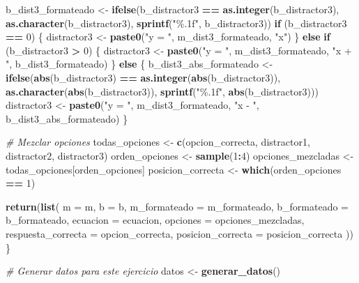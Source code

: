 \documentclass[
]{article}
\newenvironment{Shaded}{\begin{snugshade}}{\end{snugshade}}
\newcommand{\AttributeTok}[1]{\textcolor[rgb]{0.13,0.29,0.53}{#1}}
\newcommand{\CommentTok}[1]{\textcolor[rgb]{0.56,0.35,0.01}{\textit{#1}}}
\newcommand{\ControlFlowTok}[1]{\textcolor[rgb]{0.13,0.29,0.53}{\textbf{#1}}}
\newcommand{\DecValTok}[1]{\textcolor[rgb]{0.00,0.00,0.81}{#1}}
\newcommand{\FunctionTok}[1]{\textcolor[rgb]{0.13,0.29,0.53}{\textbf{#1}}}
\newcommand{\NormalTok}[1]{#1}
\newcommand{\OtherTok}[1]{\textcolor[rgb]{0.56,0.35,0.01}{#1}}
\newcommand{\SpecialCharTok}[1]{\textcolor[rgb]{0.81,0.36,0.00}{\textbf{#1}}}
\newcommand{\StringTok}[1]{\textcolor[rgb]{0.31,0.60,0.02}{#1}}
\begin{document}
\begin{Shaded}
\begin{Highlighting}[]
\NormalTok{  b\_dist3\_formateado }\OtherTok{\textless{}{-}} \FunctionTok{ifelse}\NormalTok{(b\_distractor3 }\SpecialCharTok{==} \FunctionTok{as.integer}\NormalTok{(b\_distractor3), }
                               \FunctionTok{as.character}\NormalTok{(b\_distractor3), }
                               \FunctionTok{sprintf}\NormalTok{(}\StringTok{"\%.1f"}\NormalTok{, b\_distractor3))}
  \ControlFlowTok{if}\NormalTok{ (b\_distractor3 }\SpecialCharTok{==} \DecValTok{0}\NormalTok{) \{}
\NormalTok{    distractor3 }\OtherTok{\textless{}{-}} \FunctionTok{paste0}\NormalTok{(}\StringTok{"y = "}\NormalTok{, m\_dist3\_formateado, }\StringTok{"x"}\NormalTok{)}
\NormalTok{  \} }\ControlFlowTok{else} \ControlFlowTok{if}\NormalTok{ (b\_distractor3 }\SpecialCharTok{\textgreater{}} \DecValTok{0}\NormalTok{) \{}
\NormalTok{    distractor3 }\OtherTok{\textless{}{-}} \FunctionTok{paste0}\NormalTok{(}\StringTok{"y = "}\NormalTok{, m\_dist3\_formateado, }\StringTok{"x + "}\NormalTok{, b\_dist3\_formateado)}
\NormalTok{  \} }\ControlFlowTok{else}\NormalTok{ \{}
\NormalTok{    b\_dist3\_abs\_formateado }\OtherTok{\textless{}{-}} \FunctionTok{ifelse}\NormalTok{(}\FunctionTok{abs}\NormalTok{(b\_distractor3) }\SpecialCharTok{==} \FunctionTok{as.integer}\NormalTok{(}\FunctionTok{abs}\NormalTok{(b\_distractor3)), }
                                     \FunctionTok{as.character}\NormalTok{(}\FunctionTok{abs}\NormalTok{(b\_distractor3)), }
                                     \FunctionTok{sprintf}\NormalTok{(}\StringTok{"\%.1f"}\NormalTok{, }\FunctionTok{abs}\NormalTok{(b\_distractor3)))}
\NormalTok{    distractor3 }\OtherTok{\textless{}{-}} \FunctionTok{paste0}\NormalTok{(}\StringTok{"y = "}\NormalTok{, m\_dist3\_formateado, }\StringTok{"x {-} "}\NormalTok{, b\_dist3\_abs\_formateado)}
\NormalTok{  \}}
  
  \CommentTok{\# Mezclar opciones}
\NormalTok{  todas\_opciones }\OtherTok{\textless{}{-}} \FunctionTok{c}\NormalTok{(opcion\_correcta, distractor1, distractor2, distractor3)}
\NormalTok{  orden\_opciones }\OtherTok{\textless{}{-}} \FunctionTok{sample}\NormalTok{(}\DecValTok{1}\SpecialCharTok{:}\DecValTok{4}\NormalTok{)}
\NormalTok{  opciones\_mezcladas }\OtherTok{\textless{}{-}}\NormalTok{ todas\_opciones[orden\_opciones]}
\NormalTok{  posicion\_correcta }\OtherTok{\textless{}{-}} \FunctionTok{which}\NormalTok{(orden\_opciones }\SpecialCharTok{==} \DecValTok{1}\NormalTok{)}
  
  \FunctionTok{return}\NormalTok{(}\FunctionTok{list}\NormalTok{(}
    \AttributeTok{m =}\NormalTok{ m,}
    \AttributeTok{b =}\NormalTok{ b,}
    \AttributeTok{m\_formateado =}\NormalTok{ m\_formateado,}
    \AttributeTok{b\_formateado =}\NormalTok{ b\_formateado,}
    \AttributeTok{ecuacion =}\NormalTok{ ecuacion,}
    \AttributeTok{opciones =}\NormalTok{ opciones\_mezcladas,}
    \AttributeTok{respuesta\_correcta =}\NormalTok{ opcion\_correcta,}
    \AttributeTok{posicion\_correcta =}\NormalTok{ posicion\_correcta}
\NormalTok{  ))}
\NormalTok{\}}

\CommentTok{\# Generar datos para este ejercicio}
\NormalTok{datos }\OtherTok{\textless{}{-}} \FunctionTok{generar\_datos}\NormalTok{()}
\end{Highlighting}
\end{Shaded}
\end{document}
